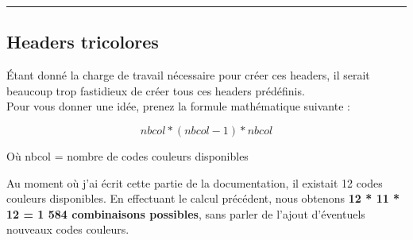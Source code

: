 \documentclass[a4paper,10pt]{article}
\begin{document}
\color{green}\par\noindent\rule{\textwidth}{0.4pt}\color{white}

\color{green}
\subsection{Headers tricolores}\color{white}
Étant donné la charge de travail nécessaire pour créer ces headers, il serait beaucoup trop fastidieux de créer tous ces headers prédéfinis.\\[1\baselineskip]

Pour vous donner une idée, prenez la formule mathématique suivante :

\[nbcol * (nbcol - 1) * nbcol\]

Où nbcol = nombre de codes couleurs disponibles\linebreak

Au moment où j'ai écrit cette partie de la documentation, il existait 12 codes couleurs disponibles. En effectuant le calcul précédent, nous obtenons \textbf{12 * 11 * 12 = 1 584 combinaisons possibles}, sans parler de l'ajout d'éventuels nouveaux codes couleurs.\\[1\baselineskip]
\end{document}
